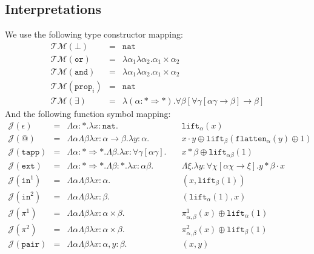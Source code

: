 \documentclass[runningheads,a4paper]{llncs}
\newcommand{\Typemap}{\mathcal{T\!M}}
\newcommand{\Termmap}{\mathcal{J}}
\newcommand{\quant}[2]{\forall #1[#2]}
\newcommand{\arrtype}{\rightarrow}
\newcommand{\arrkind}{\Rightarrow}
\newcommand{\abs}[2]{\lambda #1.#2}
\newcommand{\tabs}[2]{\Lambda #1.#2}
\newcommand{\nat}{\mathtt{nat}}
\newcommand{\flatten}{\mathtt{flatten}}
\newcommand{\lift}{\mathtt{lift}}
\begin{document}
\subsection{Interpretations}

We use the following type constructor mapping:
\[
\begin{array}{rcl}
\Typemap(\bot) & = & \nat \\
\Typemap(\mathtt{or}) & = & \lambda\alpha_1\lambda\alpha_2 . \alpha_1 \times \alpha_2 \\
\Typemap(\mathtt{and}) & = & \lambda\alpha_1\lambda\alpha_2 . \alpha_1 \times \alpha_2 \\
\Typemap(\mathtt{prop}_i) & = & \nat \\
\Typemap(\exists) & = & \lambda(\alpha : * \arrkind *) . \quant{\beta}{\quant{\gamma}{\alpha\gamma \arrtype \beta} \arrtype \beta}
\end{array}
\]
And the following function symbol mapping:
\[
\begin{array}{rcll}
\Termmap(\epsilon) & = & \Lambda \alpha:* . \lambda x:\nat. &
  \mathtt{lift}_\alpha(x) \\
\Termmap(@) & = & \Lambda\alpha\Lambda\beta\lambda x: \alpha \arrtype \beta . \lambda y :
  \alpha . \quad & x \cdot y \oplus \lift_\beta(\flatten_\alpha(
  y) \oplus 1) \\
\Termmap(\mathtt{tapp}) & = & \Lambda \alpha : * \arrkind * . \Lambda \beta . \lambda x : \quant{\gamma}{\alpha\gamma} . \quad & x * \beta \oplus \lift_{\alpha\beta}(1) \\
\Termmap(\mathtt{ext}) & = & \Lambda \alpha : * \arrkind * . \Lambda \beta : * . \lambda x:\alpha\beta . &
  \tabs{\xi}{\abs{y:\quant{\chi}{\alpha\chi
  \arrtype \xi}}{y * \beta \cdot x}} \\
\Termmap(\mathtt{in}^1) & = & \Lambda \alpha \Lambda \beta \lambda x : \alpha.\quad &
  (x, \mathtt{lift}_\beta(1)) \\
\Termmap(\mathtt{in}^2) & = & \Lambda \alpha \Lambda \beta \lambda x : \beta.\quad &
  (\mathtt{lift}_\alpha(1), x) \\
\Termmap(\pi^1) & = & \Lambda \alpha \Lambda \beta \lambda x : \alpha \times \beta.
  \quad & \pi^1_{\alpha,\beta}(x) \oplus \lift_{\alpha}(1) \\
\Termmap(\pi^2) & = & \Lambda \alpha \Lambda \beta \lambda x : \alpha \times \beta.
  \quad & \pi^2_{\alpha,\beta}(x) \oplus \lift_{\beta}(1) \\
\Termmap(\mathtt{pair}) & = & \Lambda \alpha \Lambda \beta \lambda x : \alpha, y :
  \beta.\quad & (x, y) \\
\end{array}
\]
\end{document}
